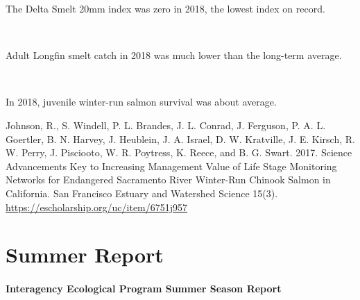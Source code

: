 \documentclass[
]{book}
\begin{document}
\begin{panel-grid}
\begin{columns-nocenter}
\begin{column800}
The Delta Smelt 20mm index was zero in 2018, the lowest index on record.

\end{column800}

\begin{column40}

~

\end{column40}

\begin{column800}

Adult Longfin smelt catch in 2018 was much lower than the long-term average.

\end{column800}

\begin{column40}

~

\end{column40}

\begin{column800}

In 2018, juvenile winter-run salmon survival was about average.

\end{column800}

\end{columns-nocenter}

\end{panel-grid}

\begin{disclaimer}
Johnson, R., S. Windell, P. L. Brandes, J. L. Conrad, J. Ferguson, P. A.
L. Goertler, B. N. Harvey, J. Heublein, J. A. Israel, D. W. Kratville,
J. E. Kirsch, R. W. Perry, J. Pisciooto, W. R. Poytress, K. Reece, and
B. G. Swart. 2017. Science Advancements Key to Increasing Management
Value of Life Stage Monitoring Networks for Endangered Sacramento River
Winter-Run Chinook Salmon in California. San Francisco Estuary and
Watershed Science 15(3). \url{https://escholarship.org/uc/item/6751j957}
\end{disclaimer}

\hypertarget{Summer}{%
\chapter{Summer Report}\label{Summer}}

\hypertarget{interagency-ecological-program-summer-season-report}{%
\subsubsection{Interagency Ecological Program Summer Season Report}\label{interagency-ecological-program-summer-season-report}}
\end{document}
